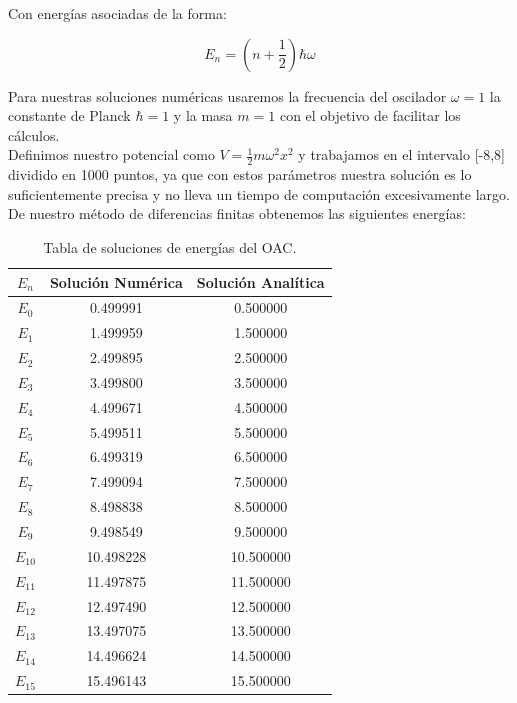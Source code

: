 \documentclass[12pt]{article}
\begin{document}
    Con energías asociadas de la forma:
    
    \begin{equation}
        E_n=\left(n+\frac{1}{2}\right)\hbar \omega 
    \end{equation}
    
    Para nuestras soluciones numéricas usaremos la frecuencia del oscilador $\omega=1$ la constante de Planck $\hbar=1$ y la masa $m=1$ con el objetivo de facilitar los cálculos.\\
    
    Definimos nuestro potencial como $V=\frac{1}{2}m\omega^2x^2$ y trabajamos en el intervalo [-8,8] dividido en 1000 puntos, ya que con estos parámetros nuestra solución es lo suficientemente precisa y no lleva un tiempo de computación excesivamente largo.\\
    
    De nuestro método de diferencias finitas obtenemos las siguientes energías:\\
    
        \begin{table}[H]
            \centering
            \begin{tabular}{|c||c||c|}
            \hline
             $E_n$& Solución Numérica &Solución Analítica \\ [0.5ex] 
            \hline\hline
            $E_0$& 0.499991 & 0.500000 \\
            \hline
            $E_1$& 1.499959 & 1.500000 \\
            \hline
            $E_2$& 2.499895 &  2.500000\\
            \hline
            $E_3$& 3.499800  & 3.500000 \\
            \hline
            $E_4$& 4.499671 & 4.500000\\
            \hline
            $E_5$& 5.499511 & 5.500000 \\
            \hline
            $E_6$& 6.499319 & 6.500000 \\
            \hline
            $E_7$& 7.499094  & 7.500000 \\
            \hline
            $E_8$& 8.498838 & 8.500000 \\
            \hline
            $E_9$& 9.498549 & 9.500000 \\
            \hline
            $E_10$& 10.498228 & 10.500000 \\
            \hline
             $E_11$& 11.497875& 11.500000 \\
            \hline
            $E_12$& 12.497490 & 12.500000 \\
            \hline
            $E_13$& 13.497075 & 13.500000 \\
            \hline
            $E_14$& 14.496624 & 14.500000 \\
            \hline
            $E_15$& 15.496143 & 15.500000 \\
            \hline
            \end{tabular}
            \caption{Tabla de soluciones de energías del OAC.}
            \end{table}
            
\end{document}
